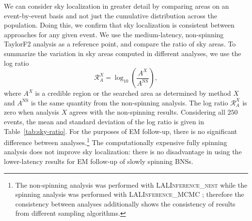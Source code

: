 We can consider sky localization in greater detail by comparing areas on an event-by-event basis and not just the cumulative distribution across the population. Doing this, we confirm that sky localization is consistent between approaches for any given event. We use the medium-latency, non-spinning TaylorF2 analysis as a reference point, and compare the ratio of sky areas. To summarize the variation in sky areas computed in different analyses, we use the log ratio
\begin{equation}
\mathcal{R}_A^X = \log_{10}\left(\frac{A^X}{A^\mathrm{NS}}\right),
\end{equation}
where $A^X$ is a credible region or the searched area as determined by method $X$ and $A^\mathrm{NS}$ is the same quantity from the non-spinning analysis. The log ratio $\mathcal{R}_A^X$ is zero when analysis $X$ agrees with the non-spinning results. Considering all $250$ events, the mean and standard deviation of the log ratio is given in Table~\ref{tab:sky-ratio}. For the purposes of EM follow-up, there is no significant difference between analyses.\footnote{The non-spinning analysis was performed with \textsc{LALInference\_nest} while the spinning analysis was performed with \textsc{LALInference\_MCMC} \citep{Veitch_2014}; therefore the consistency between analyses additionally shows the consistency of results from different sampling algorithms.} The computationally expensive fully spinning analysis does not improve sky localization: there is no disadvantage in using the lower-latency results for EM follow-up of slowly spinning BNSs.
  
  
  
  
  
  
  
  